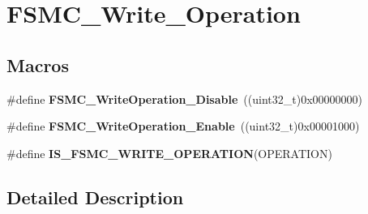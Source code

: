 \hypertarget{group___f_s_m_c___write___operation}{\section{F\-S\-M\-C\-\_\-\-Write\-\_\-\-Operation}
\label{group___f_s_m_c___write___operation}
}
\subsection*{Macros}
\begin{DoxyCompactItemize}
\item 
\hypertarget{group___f_s_m_c___write___operation_ga74176320484248f06abae854170f9d9f}{\#define {\bfseries F\-S\-M\-C\-\_\-\-Write\-Operation\-\_\-\-Disable}~((uint32\-\_\-t)0x00000000)}\label{group___f_s_m_c___write___operation_ga74176320484248f06abae854170f9d9f}

\item 
\hypertarget{group___f_s_m_c___write___operation_ga2478beb6dd8861b34a16b8a57a795e56}{\#define {\bfseries F\-S\-M\-C\-\_\-\-Write\-Operation\-\_\-\-Enable}~((uint32\-\_\-t)0x00001000)}\label{group___f_s_m_c___write___operation_ga2478beb6dd8861b34a16b8a57a795e56}

\item 
\#define {\bfseries I\-S\-\_\-\-F\-S\-M\-C\-\_\-\-W\-R\-I\-T\-E\-\_\-\-O\-P\-E\-R\-A\-T\-I\-O\-N}(O\-P\-E\-R\-A\-T\-I\-O\-N)
\end{DoxyCompactItemize}


\subsection{Detailed Description}


